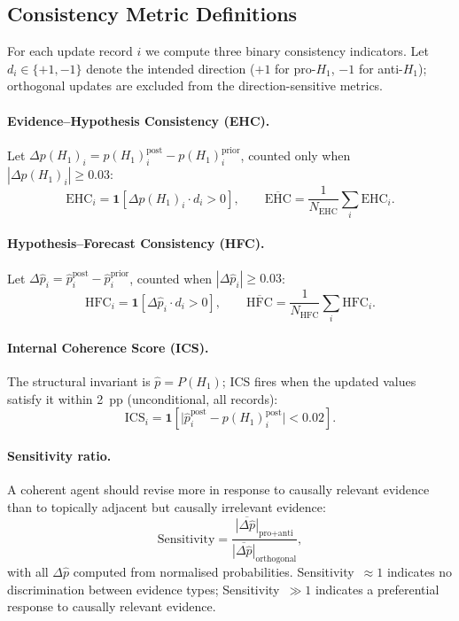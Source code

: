 \documentclass{article} %
\begin{document}
\subsection{Consistency Metric Definitions}
\label{app:metrics}

For each update record $i$ we compute three binary consistency indicators.  Let
$d_i \in \{+1,-1\}$ denote the intended direction ($+1$ for pro-$H_1$, $-1$ for
anti-$H_1$); orthogonal updates are excluded from the direction-sensitive metrics.

\paragraph{Evidence--Hypothesis Consistency (EHC).}
Let $\Delta p(H_1)_i = p(H_1)_i^{\text{post}} - p(H_1)_i^{\text{prior}}$, counted only when
$|\Delta p(H_1)_i| \geq 0.03$:
\begin{equation}
    \text{EHC}_i = \mathbf{1}\!\left[\Delta p(H_1)_i \cdot d_i > 0\right],
    \qquad
    \overline{\text{EHC}} = \frac{1}{N_\text{EHC}}\sum_{i}\text{EHC}_i.
    \label{eq:ehc}
\end{equation}

\paragraph{Hypothesis--Forecast Consistency (HFC).}
Let $\Delta\hat{p}_i = \hat{p}_i^{\text{post}} - \hat{p}_i^{\text{prior}}$, counted when
$|\Delta\hat{p}_i| \geq 0.03$:
\begin{equation}
    \text{HFC}_i = \mathbf{1}\!\left[\Delta\hat{p}_i \cdot d_i > 0\right],
    \qquad
    \overline{\text{HFC}} = \frac{1}{N_\text{HFC}}\sum_{i}\text{HFC}_i.
    \label{eq:hfc}
\end{equation}

\paragraph{Internal Coherence Score (ICS).}
The structural invariant is $\hat{p} = P(H_1)$; ICS fires when the updated values satisfy
it within 2~pp (unconditional, all records):
\begin{equation}
    \text{ICS}_i = \mathbf{1}\!\left[\bigl|\hat{p}_i^{\text{post}} -
    p(H_1)_i^{\text{post}}\bigr| < 0.02\right].
    \label{eq:ics}
\end{equation}

\paragraph{Sensitivity ratio.}
A coherent agent should revise more in response to causally relevant evidence than to
topically adjacent but causally irrelevant evidence:
\begin{equation}
    \text{Sensitivity} =
    \frac{\overline{|\Delta\hat{p}|}_{\text{pro}+\text{anti}}}
         {\overline{|\Delta\hat{p}|}_{\text{orthogonal}}},
    \label{eq:sensitivity}
\end{equation}
with all $\Delta\hat{p}$ computed from normalised probabilities.  Sensitivity~$\approx 1$
indicates no discrimination between evidence types; Sensitivity~$\gg 1$ indicates a
preferential response to causally relevant evidence.
\end{document}
